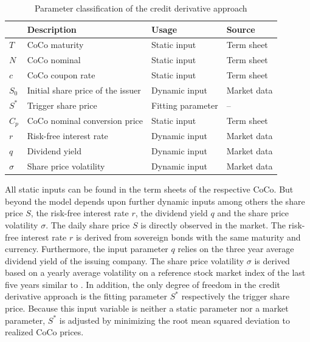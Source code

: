 \begin{table}[H]
	\setlength{\extrarowheight}{2.5pt}
	\centering
	\begin{tabular}{llll}
		\toprule
			 & \textbf{Description} & \textbf{Usage} & \textbf{Source} \\
		\midrule
			$T$ & CoCo maturity & Static input & Term sheet \\
			$N$ & CoCo nominal & Static input & Term sheet \\			
			$c$ & CoCo coupon rate & Static input & Term sheet \\
			$S_0$ & Initial share price of the issuer & Dynamic input & Market data \\
			$S^*$ & Trigger share price & Fitting parameter & -- \\
			$C_p$ & CoCo nominal conversion price & Static input & Term sheet \\
			$r$ & Risk-free interest rate & Dynamic input & Market data \\
			$q$ & Dividend yield & Dynamic input & Market data\\
			$\sigma$& Share price volatility & Dynamic input & Market data \\
		\bottomrule
	\end{tabular}
	\caption[Parameter classification of the credit derivative approach]{Parameter classification of the credit derivative approach \citep{wilkens2014contingent}}
	\label{creditparameters}
\end{table}

All static inputs can be found in the term sheets of the respective CoCo. But beyond the model depends upon further dynamic inputs among others the share price $S$, the risk-free interest rate $r$, the dividend yield $q$ and the share price volatility $\sigma$. The daily share price $S$ is directly observed in the market. The risk-free interest rate $r$ is derived from sovereign bonds with the same maturity and currency. Furthermore, the input parameter $q$ relies on the three year average dividend yield of the issuing company. The share price volatility $\sigma$ is derived based on a yearly average volatility on a reference stock market index of the last five years similar to \citet{alvemar2012modelling}. In addition, the only degree of freedom in the credit derivative approach is the fitting parameter $S^*$ respectively the trigger share price. Because this input variable is neither a static parameter nor a market parameter, $S^*$ is adjusted by minimizing the root mean squared deviation to realized CoCo prices. \citep{erismann2011analytical}

